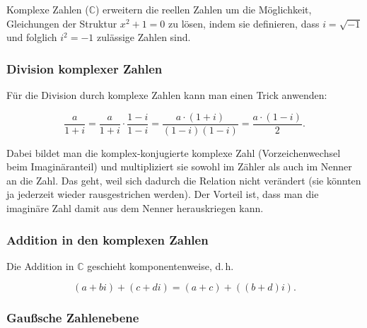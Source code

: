\documentclass{scrartcl}
\begin{document}
Komplexe Zahlen ($\mathbb{C}$) erweitern die reellen Zahlen um die Möglichkeit, Gleichungen
der Struktur $x^2 + 1 = 0$ zu lösen, indem sie definieren, dass $i = \sqrt{-1}$ und folglich
$i^2 = -1$ zulässige Zahlen sind.

\subsubsection{Division komplexer Zahlen}

Für die Division durch komplexe Zahlen kann man einen Trick anwenden:

\begin{equation}
	\frac{a}{1 + i} = \frac{a}{1 + i} \cdot \frac{1 - i}{1 - i} =
	\frac{a \cdot (1 + i)}{(1 - i)(1 - i)} = 
	\frac{a \cdot (1 - i)}{2}.
\end{equation}

Dabei bildet man die komplex-konjugierte komplexe Zahl (Vorzeichenwechsel beim Imaginäranteil) und multipliziert sie sowohl im
Zähler als auch im Nenner an die Zahl. Das geht, weil sich dadurch die Relation nicht verändert (sie könnten ja jederzeit
wieder rausgestrichen werden). Der Vorteil ist, dass man die imaginäre Zahl damit aus dem 
Nenner herauskriegen kann.

\subsubsection{Addition in den komplexen Zahlen}

Die Addition in $\mathbb{C}$ geschieht komponentenweise, d.\,h.

\begin{equation}
	(a + bi) + (c + di) = (a+c) + ((b+d)i).
\end{equation}

\subsubsection{Gaußsche Zahlenebene}
\end{document}
